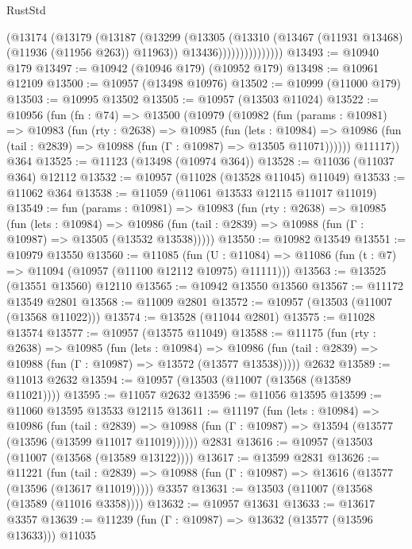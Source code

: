 \begin{lexlean}{RustStd}
\begin{coremodule}
{\begin{coremodule}
{{{{{{{{{{{{{{{{{{{{{{{{{{{{{{{{{                        (@13174
                          (@13179
                            (@13187
                              (@13299
                                (@13305
                                  (@13310 (@13467 (@11931 @13468) (@11936 (@11956 @263)) @11963))
                                  @13436)))))))))))))))
@13493 := @10940 @179
@13497 := @10942 (@10946 @179) (@10952 @179)
@13498 := @10961 @12109
@13500 := @10957 (@13498 @10976)
@13502 := @10999 (@11000 @179)
@13503 := @10995 @13502
@13505 := @10957 (@13503 @11024)
@13522 := @10956
    (fun (fn : @74) =>
    @13500
      (@10979
        (@10982
          (fun (params : @10981) =>
          @10983
            (fun (rty : @2638) =>
            @10985
              (fun (lets : @10984) =>
              @10986 (fun (tail : @2839) => @10988 (fun (Γ : @10987) => @13505 @11071))))))
        @11117))
    @364
@13525 := @11123 (@13498 (@10974 @364))
@13528 := @11036 (@11037 @364) @12112
@13532 := @10957 (@11028 (@13528 @11045) @11049)
@13533 := @11062 @364
@13538 := @11059 (@11061 @13533 @12115 @11017 @11019)
@13549 := fun (params : @10981) =>
  @10983
    (fun (rty : @2638) =>
    @10985
      (fun (lets : @10984) =>
      @10986 (fun (tail : @2839) => @10988 (fun (Γ : @10987) => @13505 (@13532 @13538)))))
@13550 := @10982 @13549
@13551 := @10979 @13550
@13560 := @11085
    (fun (U : @11084) => @11086 (fun (t : @7) => @11094 (@10957 (@11100 @12112 @10975) @11111)))
@13563 := @13525 (@13551 @13560) @12110
@13565 := @10942 @13550 @13560
@13567 := @11172 @13549 @2801
@13568 := @11009 @2801
@13572 := @10957 (@13503 (@11007 (@13568 @11022)))
@13574 := @13528 (@11044 @2801)
@13575 := @11028 @13574
@13577 := @10957 (@13575 @11049)
@13588 := @11175
    (fun (rty : @2638) =>
    @10985
      (fun (lets : @10984) =>
      @10986 (fun (tail : @2839) => @10988 (fun (Γ : @10987) => @13572 (@13577 @13538)))))
    @2632
@13589 := @11013 @2632
@13594 := @10957 (@13503 (@11007 (@13568 (@13589 @11021))))
@13595 := @11057 @2632
@13596 := @11056 @13595
@13599 := @11060 @13595 @13533 @12115
@13611 := @11197
    (fun (lets : @10984) =>
    @10986
      (fun (tail : @2839) =>
      @10988 (fun (Γ : @10987) => @13594 (@13577 (@13596 (@13599 @11017 @11019))))))
    @2831
@13616 := @10957 (@13503 (@11007 (@13568 (@13589 @13122))))
@13617 := @13599 @2831
@13626 := @11221
    (fun (tail : @2839) => @10988 (fun (Γ : @10987) => @13616 (@13577 (@13596 (@13617 @11019)))))
    @3357
@13631 := @13503 (@11007 (@13568 (@13589 (@11016 @3358))))
@13632 := @10957 @13631
@13633 := @13617 @3357
@13639 := @11239 (fun (Γ : @10987) => @13632 (@13577 (@13596 @13633))) @11035
}}}}}}}}}}}}}}}}}}}}}}}}}}}}}}}}}
\end{coremodule}}
\end{coremodule}
\end{lexlean}
